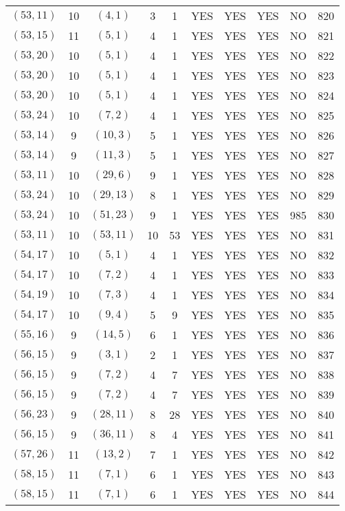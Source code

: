 \begin{longtable}{|c|c|c|c|c|c|c|c|c|c|}
$(53, 11)$ & 10 & $(4, 1)$ & 3 & 1 & YES & YES & YES & NO & 820\\
$(53, 15)$ & 11 & $(5, 1)$ & 4 & 1 & YES & YES & YES & NO & 821\\
$(53, 20)$ & 10 & $(5, 1)$ & 4 & 1 & YES & YES & YES & NO & 822\\
$(53, 20)$ & 10 & $(5, 1)$ & 4 & 1 & YES & YES & YES & NO & 823\\
$(53, 20)$ & 10 & $(5, 1)$ & 4 & 1 & YES & YES & YES & NO & 824\\
$(53, 24)$ & 10 & $(7, 2)$ & 4 & 1 & YES & YES & YES & NO & 825\\
$(53, 14)$ & 9 & $(10, 3)$ & 5 & 1 & YES & YES & YES & NO & 826\\
$(53, 14)$ & 9 & $(11, 3)$ & 5 & 1 & YES & YES & YES & NO & 827\\
$(53, 11)$ & 10 & $(29, 6)$ & 9 & 1 & YES & YES & YES & NO & 828\\
$(53, 24)$ & 10 & $(29, 13)$ & 8 & 1 & YES & YES & YES & NO & 829\\
$(53, 24)$ & 10 & $(51, 23)$ & 9 & 1 & YES & YES & YES & 985 & 830\\
$(53, 11)$ & 10 & $(53, 11)$ & 10 & 53 & YES & YES & YES & NO & 831\\
$(54, 17)$ & 10 & $(5, 1)$ & 4 & 1 & YES & YES & YES & NO & 832\\
$(54, 17)$ & 10 & $(7, 2)$ & 4 & 1 & YES & YES & YES & NO & 833\\
$(54, 19)$ & 10 & $(7, 3)$ & 4 & 1 & YES & YES & YES & NO & 834\\
$(54, 17)$ & 10 & $(9, 4)$ & 5 & 9 & YES & YES & YES & NO & 835\\
$(55, 16)$ & 9 & $(14, 5)$ & 6 & 1 & YES & YES & YES & NO & 836\\
$(56, 15)$ & 9 & $(3, 1)$ & 2 & 1 & YES & YES & YES & NO & 837\\
$(56, 15)$ & 9 & $(7, 2)$ & 4 & 7 & YES & YES & YES & NO & 838\\
$(56, 15)$ & 9 & $(7, 2)$ & 4 & 7 & YES & YES & YES & NO & 839\\
$(56, 23)$ & 9 & $(28, 11)$ & 8 & 28 & YES & YES & YES & NO & 840\\
$(56, 15)$ & 9 & $(36, 11)$ & 8 & 4 & YES & YES & YES & NO & 841\\
$(57, 26)$ & 11 & $(13, 2)$ & 7 & 1 & YES & YES & YES & NO & 842\\
$(58, 15)$ & 11 & $(7, 1)$ & 6 & 1 & YES & YES & YES & NO & 843\\
$(58, 15)$ & 11 & $(7, 1)$ & 6 & 1 & YES & YES & YES & NO & 844\\

\end{longtable}
